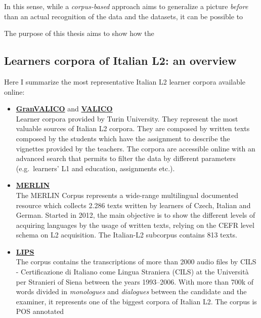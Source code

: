 \documentclass[a4paper,twoside,12pt,chapterprefix=false,bibliography=totocnumbered,listof=flat]{scrbook}
\theoremstyle{definition}
\theoremstyle{definition}
\theoremstyle{definition}
\theoremstyle{remark}
\begin{document}
In this sense, while a \emph{corpus-based} approach aims to generalize a
picture \emph{before} than an actual recognition of the data and the
datasets, it can be possible to

The purpose of this thesis aims to show how the

\subsection{Learners corpora of Italian L2: an
overview}\label{learners-corpora-of-italian-l2-an-overview}

Here I summarize the most representative Italian L2 learner corpora
available online:

\begin{itemize}
\item
  \textbf{\href{http://www.valico.org/valico_b_CORPUS.html}{GranVALICO}}
  and \textbf{\href{http://www.valico.org/valico_CORPUS.html}{VALICO}}
  \citep{valico}\\
  Learner corpora provided by Turin University. They represent the most
  valuable sources of Italian L2 corpora. They are composed by written
  texts composed by the students which have the assignment to describe
  the vignettes provided by the teachers. The corpora are accessible
  online with an advanced search that permits to filter the data by
  different parameters (e.g.~learners' L1 and education, assignments
  etc.).
\item
  \textbf{\href{http://merlin-platform.eu}{MERLIN}} \citep{merlin}\\
  The MERLIN Corpus represents a wide-range multilingual documented
  resource which collects 2.286 texts written by learners of Czech,
  Italian and German. Started in 2012, the main objective is to show the
  different levels of acquiring languages by the usage of written texts,
  relying on the CEFR level schema on L2 acquisition. The Italian-L2
  subcorpus contains 813 texts.
\item
  \textbf{\href{http://parlaritaliano.it/index.php/en/data/653-corpus-lips}{LIPS}}
  \citep{lips}\\
  The corpus contains the transcriptions of more than 2000 audio files
  by CILS - Certificazione di Italiano come Lingua Straniera (CILS) at
  the Università per Stranieri of Siena between the years 1993--2006.
  With more than 700k of words divided in \emph{monologues} and
  \emph{dialogues} between the candidate and the examiner, it represents
  one of the biggest corpora of Italian L2. The corpus is POS annotated

\end{itemize}
\end{document}
